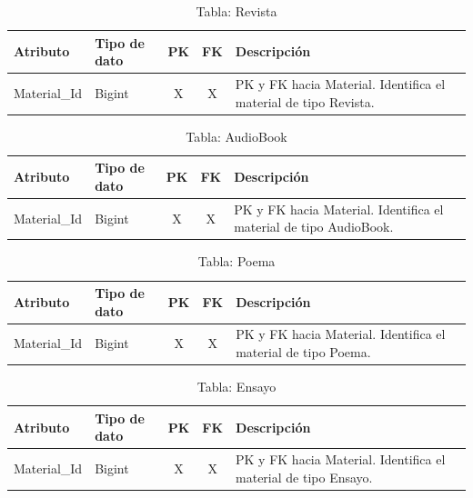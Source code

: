 \documentclass[12pt,a4paper]{article}
\begin{document}
\begin{table}[H]
\centering
\begin{tabularx}{\textwidth}{|l|l|c|c|X|}
\hline
\textbf{Atributo} & \textbf{Tipo de dato} & \textbf{PK} & \textbf{FK} & \textbf{Descripción} \\ \hline
Material\_Id & Bigint & X & X & PK y FK hacia Material. Identifica el material de tipo Revista. \\ \hline
\end{tabularx}
\caption{Tabla: Revista}
\end{table}

\begin{table}[H]
\centering
\begin{tabularx}{\textwidth}{|l|l|c|c|X|}
\hline
\textbf{Atributo} & \textbf{Tipo de dato} & \textbf{PK} & \textbf{FK} & \textbf{Descripción} \\ \hline
Material\_Id & Bigint & X & X & PK y FK hacia Material. Identifica el material de tipo AudioBook. \\ \hline
\end{tabularx}
\caption{Tabla: AudioBook}
\end{table}

\begin{table}[H]
\centering
\begin{tabularx}{\textwidth}{|l|l|c|c|X|}
\hline
\textbf{Atributo} & \textbf{Tipo de dato} & \textbf{PK} & \textbf{FK} & \textbf{Descripción} \\ \hline
Material\_Id & Bigint & X & X & PK y FK hacia Material. Identifica el material de tipo Poema. \\ \hline
\end{tabularx}
\caption{Tabla: Poema}
\end{table}

\begin{table}[H]
\centering
\begin{tabularx}{\textwidth}{|l|l|c|c|X|}
\hline
\textbf{Atributo} & \textbf{Tipo de dato} & \textbf{PK} & \textbf{FK} & \textbf{Descripción} \\ \hline
Material\_Id & Bigint & X & X & PK y FK hacia Material. Identifica el material de tipo Ensayo. \\ \hline
\end{tabularx}
\caption{Tabla: Ensayo}
\end{table}
\end{document}
